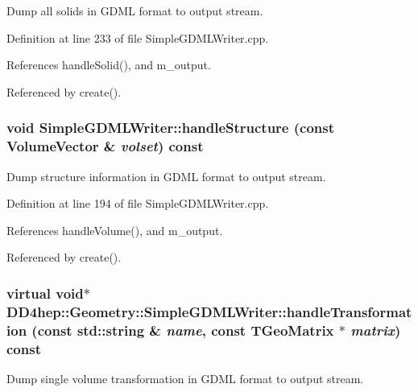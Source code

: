 Dump all solids in GDML format to output stream. 

Definition at line 233 of file SimpleGDMLWriter.cpp.

References handleSolid(), and m\_\-output.

Referenced by create().\hypertarget{class_d_d4hep_1_1_geometry_1_1_simple_g_d_m_l_writer_a2deafeaf88bb796a0063f746adc7025d}{
\subsubsection[{handleStructure}]{\setlength{\rightskip}{0pt plus 5cm}void SimpleGDMLWriter::handleStructure (const {\bf VolumeVector} \& {\em volset}) const}}
\label{class_d_d4hep_1_1_geometry_1_1_simple_g_d_m_l_writer_a2deafeaf88bb796a0063f746adc7025d}


Dump structure information in GDML format to output stream. 

Definition at line 194 of file SimpleGDMLWriter.cpp.

References handleVolume(), and m\_\-output.

Referenced by create().\hypertarget{class_d_d4hep_1_1_geometry_1_1_simple_g_d_m_l_writer_ababbd95c6645b282fdde7fcff6e0ceb5}{
\subsubsection[{handleTransformation}]{\setlength{\rightskip}{0pt plus 5cm}virtual void$\ast$ DD4hep::Geometry::SimpleGDMLWriter::handleTransformation (const std::string \& {\em name}, \/  const TGeoMatrix $\ast$ {\em matrix}) const}}
\label{class_d_d4hep_1_1_geometry_1_1_simple_g_d_m_l_writer_ababbd95c6645b282fdde7fcff6e0ceb5}


Dump single volume transformation in GDML format to output stream. 


